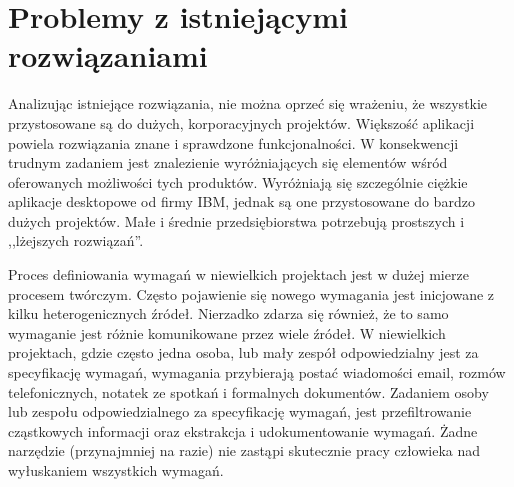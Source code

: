   \section{Problemy z istniejącymi rozwiązaniami}

      Analizując istniejące rozwiązania, nie można oprzeć się wrażeniu, że wszystkie przystosowane są do dużych, korporacyjnych projektów. Większość aplikacji powiela rozwiązania znane i sprawdzone funkcjonalności. W konsekwencji trudnym zadaniem jest znalezienie wyróżniających się elementów wśród oferowanych możliwości tych produktów. Wyróżniają się szczególnie ciężkie aplikacje desktopowe od firmy IBM, jednak są one przystosowane do bardzo dużych projektów. Małe i średnie przedsiębiorstwa potrzebują prostszych i ,,lżejszych rozwiązań''. 

      Proces definiowania wymagań w niewielkich projektach jest w dużej mierze procesem twórczym. Często pojawienie się nowego wymagania jest inicjowane z kilku heterogenicznych źródeł. Nierzadko zdarza się również, że to samo wymaganie jest różnie komunikowane przez wiele źródeł. W niewielkich projektach, gdzie często jedna osoba, lub mały zespół odpowiedzialny jest za specyfikację wymagań, wymagania przybierają postać wiadomości email, rozmów telefonicznych, notatek ze spotkań i formalnych dokumentów. Zadaniem osoby lub zespołu odpowiedzialnego za specyfikację wymagań, jest przefiltrowanie cząstkowych informacji oraz ekstrakcja i udokumentowanie wymagań. Żadne narzędzie (przynajmniej na razie) nie zastąpi skutecznie pracy człowieka nad wyłuskaniem wszystkich wymagań. 
